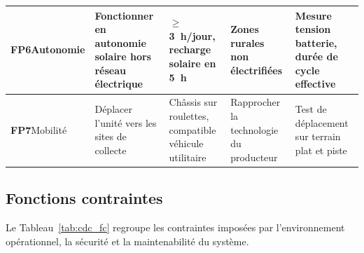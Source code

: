 \begin{table}[H]
\begin{tabularx}{\textwidth}{|p{2.3cm}|L|p{2.1cm}|L|L|}
\textbf{FP6}\newline Autonomie &
Fonctionner en autonomie solaire hors réseau électrique &
$\geq$ 3~h/jour, recharge solaire en 5~h &
Zones rurales non électrifiées &
Mesure tension batterie, durée de cycle effective \\ \hline

\textbf{FP7}\newline Mobilité &
Déplacer l'unité vers les sites de collecte &
Châssis sur roulettes, compatible véhicule utilitaire &
Rapprocher la technologie du producteur &
Test de déplacement sur terrain plat et piste \\ \hline

\end{tabularx}
\end{table}

\subsection{Fonctions contraintes}

Le Tableau~\ref{tab:cdc_fc} regroupe les contraintes imposées par l'environnement opérationnel, la sécurité et la maintenabilité du système.

